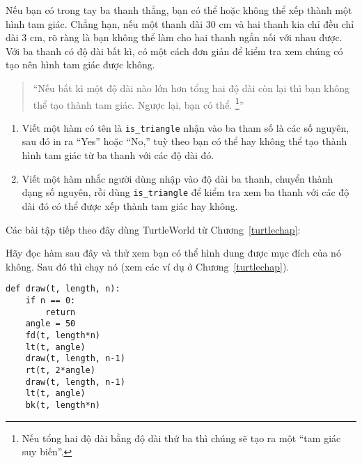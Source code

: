 \documentclass[11pt]{book}
\begin{document}
\begin{ex}

Nếu bạn có trong tay ba thanh thẳng, bạn có thể hoặc không thể xếp
thành một hình tam giác. Chẳng hạn, nếu một thanh dài 30 cm và
hai thanh kia chỉ đều chỉ dài 3 cm, rõ ràng là bạn không thể làm cho 
hai thanh ngắn nối với nhau được. Với ba thanh có độ dài bất kì, có
một cách đơn giản để kiểm tra xem chúng có tạo nên hình tam giác
được không.

\begin{quotation}
``Nếu bất kì một độ dài nào lớn hơn tổng hai độ dài còn lại thì
bạn không thể tạo thành tam giác. Ngược lại, bạn có thể.
\footnote{Nếu tổng hai độ dài bằng độ dài thứ ba thì chúng sẽ tạo ra
một ``tam giác suy biến''.}''
\end{quotation}

\begin{enumerate}

\item Viết một hàm có tên là \verb"is_triangle" nhận vào ba tham số
là các số nguyên, sau đó in ra ``Yes'' hoặc ``No,'' tuỳ theo bạn có thể
hay không thể tạo thành hình tam giác từ ba thanh với các độ dài đó.

\item Viết một hàm nhắc người dùng nhập vào độ dài ba thanh, chuyển
thành dạng số nguyên, rồi dùng \verb"is_triangle" để kiểm tra xem
ba thanh với các độ dài đó có thể được xếp thành tam giác hay không.

\end{enumerate}

\end{ex}

Các bài tập tiếp theo đây dùng TurtleWorld từ Chương~\ref{turtlechap}:


\begin{ex}

Hãy đọc hàm sau đây và thử xem bạn có thể hình dung được mục đích
của nó không. Sau đó thì chạy nó (xem các ví dụ ở Chương~\ref{turtlechap}).

\beforeverb
\begin{verbatim}
def draw(t, length, n):
    if n == 0:
        return
    angle = 50
    fd(t, length*n)
    lt(t, angle)
    draw(t, length, n-1)
    rt(t, 2*angle)
    draw(t, length, n-1)
    lt(t, angle)
    bk(t, length*n)
\end{verbatim}
\afterverb

\end{ex}
\end{document}
